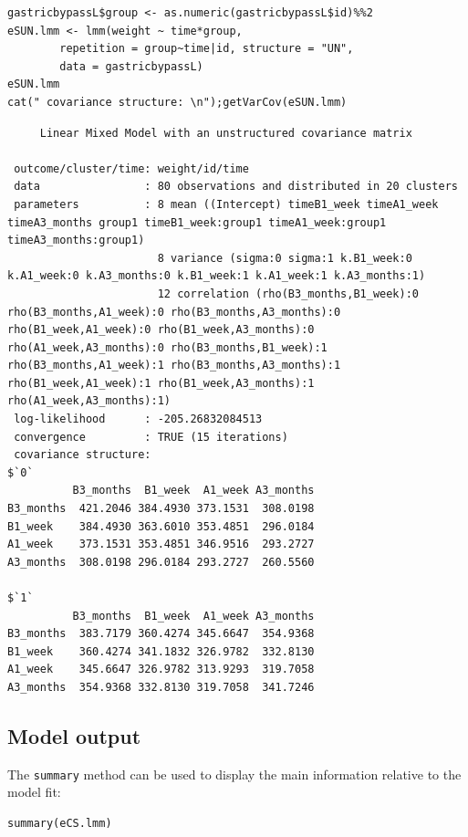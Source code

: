 \documentclass[12pt]{article}
\begin{document}
\lstset{language=r,label= ,caption= ,captionpos=b,numbers=none}
\begin{lstlisting}
gastricbypassL$group <- as.numeric(gastricbypassL$id)%%2
eSUN.lmm <- lmm(weight ~ time*group,
		repetition = group~time|id, structure = "UN",
		data = gastricbypassL)
eSUN.lmm
cat(" covariance structure: \n");getVarCov(eSUN.lmm)
\end{lstlisting}

\begin{verbatim}
     Linear Mixed Model with an unstructured covariance matrix 

 outcome/cluster/time: weight/id/time 
 data                : 80 observations and distributed in 20 clusters 
 parameters          : 8 mean ((Intercept) timeB1_week timeA1_week timeA3_months group1 timeB1_week:group1 timeA1_week:group1 timeA3_months:group1) 
                       8 variance (sigma:0 sigma:1 k.B1_week:0 k.A1_week:0 k.A3_months:0 k.B1_week:1 k.A1_week:1 k.A3_months:1) 
                       12 correlation (rho(B3_months,B1_week):0 rho(B3_months,A1_week):0 rho(B3_months,A3_months):0 rho(B1_week,A1_week):0 rho(B1_week,A3_months):0 rho(A1_week,A3_months):0 rho(B3_months,B1_week):1 rho(B3_months,A1_week):1 rho(B3_months,A3_months):1 rho(B1_week,A1_week):1 rho(B1_week,A3_months):1 rho(A1_week,A3_months):1) 
 log-likelihood      : -205.26832084513 
 convergence         : TRUE (15 iterations)
 covariance structure: 
$`0`
          B3_months  B1_week  A1_week A3_months
B3_months  421.2046 384.4930 373.1531  308.0198
B1_week    384.4930 363.6010 353.4851  296.0184
A1_week    373.1531 353.4851 346.9516  293.2727
A3_months  308.0198 296.0184 293.2727  260.5560

$`1`
          B3_months  B1_week  A1_week A3_months
B3_months  383.7179 360.4274 345.6647  354.9368
B1_week    360.4274 341.1832 326.9782  332.8130
A1_week    345.6647 326.9782 313.9293  319.7058
A3_months  354.9368 332.8130 319.7058  341.7246
\end{verbatim}

\clearpage
\subsection{Model output}
\label{sec:org99dfe18}

The \texttt{summary} method can be used to display the main information
relative to the model fit:
\lstset{language=r,label= ,caption= ,captionpos=b,numbers=none}
\begin{lstlisting}
summary(eCS.lmm)
\end{lstlisting}
\end{document}
